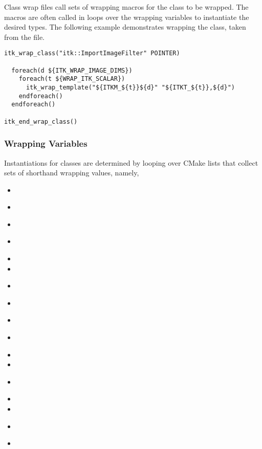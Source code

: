 Class wrap files call sets of wrapping macros for the class to be wrapped. The
macros are often called in loops over the wrapping variables to instantiate the
desired types. The following example demonstrates wrapping the
 class, taken from the
 file.

\begin{verbatim}
itk_wrap_class("itk::ImportImageFilter" POINTER)

  foreach(d ${ITK_WRAP_IMAGE_DIMS})
    foreach(t ${WRAP_ITK_SCALAR})
      itk_wrap_template("${ITKM_${t}}${d}" "${ITKT_${t}},${d}")
    endforeach()
  endforeach()

itk_end_wrap_class()
\end{verbatim}


\subsubsection{Wrapping Variables}

Instantiations for classes are determined by looping over CMake lists that
collect sets of shorthand wrapping values, namely,

\begin{itemize}
  \item {}
  \item {}
    \\
  \item {}
  \item {}
    \\
  \item {}
  \item {}
  \item {}
    \\
  \item {}
  \item {}
    \\
  \item {}
    \\
  \item {}
  \item {}
  \item {}
    \\
  \item {}
  \item {}
  \item {}
    \\
  \item {}
\end{itemize}

